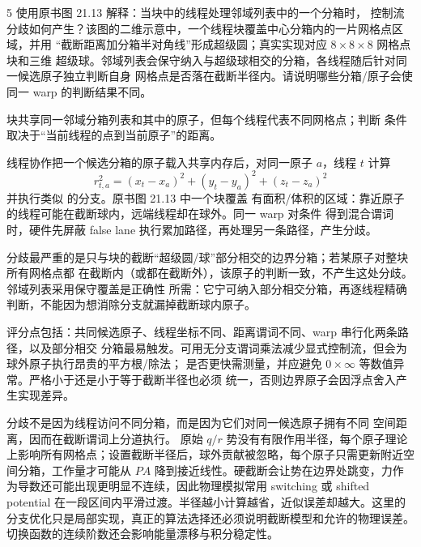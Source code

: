 \begin{solutionexercise}{5}
\problemheading 使用原书图 21.13 解释：当块中的线程处理邻域列表中的一个分箱时，
控制流分歧如何产生？该图的二维示意中，一个线程块覆盖中心分箱内的一片网格点区域，并用
“截断距离加分箱半对角线”形成超级圆；真实实现对应 $8\times8\times8$ 网格点块和三维
超级球。邻域列表会保守纳入与超级球相交的分箱，各线程随后针对同一候选原子独立判断自身
网格点是否落在截断半径内。请说明哪些分箱/原子会使同一 warp 的判断结果不同。

\approachheading 块共享同一邻域分箱列表和其中的原子，但每个线程代表不同网格点；判断
条件取决于“当前线程的点到当前原子”的距离。

\answerheading 线程协作把一个候选分箱的原子载入共享内存后，对同一原子 $a$，线程
$t$ 计算
\[
 r_{t,a}^2=(x_t-x_a)^2+(y_t-y_a)^2+(z_t-z_a)^2
\]
并执行类似  的分支。原书图 21.13 中一个块覆盖
有面积/体积的区域：靠近原子的线程可能在截断球内，远端线程却在球外。同一 warp 对条件
得到混合谓词时，硬件先屏蔽 false lane 执行累加路径，再处理另一条路径，产生分歧。

分歧最严重的是只与块的截断“超级圆/球”部分相交的边界分箱；若某原子对整块所有网格点都
在截断内（或都在截断外），该原子的判断一致，不产生这处分歧。邻域列表采用保守覆盖是正确性
所需：它宁可纳入部分相交分箱，再逐线程精确判断，不能因为想消除分支就漏掉截断球内原子。

评分点包括：共同候选原子、线程坐标不同、距离谓词不同、warp 串行化两条路径，以及部分相交
分箱最易触发。可用无分支谓词乘法减少显式控制流，但会为球外原子执行昂贵的平方根/除法；
是否更快需测量，并应避免 $0\times\infty$ 等数值异常。严格小于还是小于等于截断半径也必须
统一，否则边界原子会因浮点舍入产生实现差异。

\conclusionheading 分歧不是因为线程访问不同分箱，而是因为它们对同一候选原子拥有不同
空间距离，因而在截断谓词上分道执行。
\discussionheading
{}
原始 $q/r$ 势没有有限作用半径，每个原子理论上影响所有网格点；设置截断半径后，球外贡献被忽略，每个原子只需更新附近空间分箱，工作量才可能从 $PA$ 降到接近线性。硬截断会让势在边界处跳变，力作为导数还可能出现更明显不连续，因此物理模拟常用 switching 或 shifted potential 在一段区间内平滑过渡。半径越小计算越省，近似误差却越大。这里的分支优化只是局部实现，真正的算法选择还必须说明截断模型和允许的物理误差。切换函数的连续阶数还会影响能量漂移与积分稳定性。


\end{solutionexercise}
